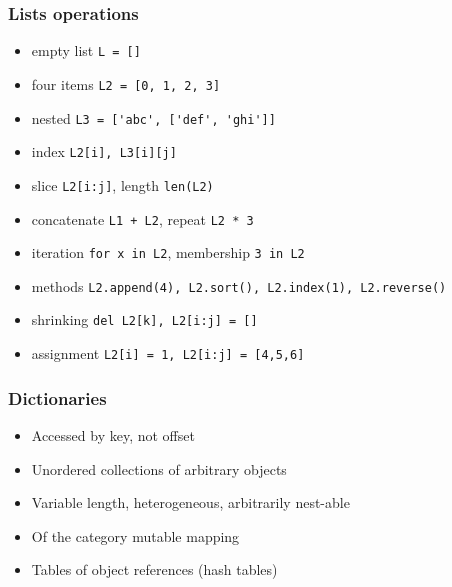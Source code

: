 \begin{frame}[fragile]\frametitle{Lists operations}
  \begin{itemize}
  \item empty list \lstinline{L = []}
  \item four items \lstinline{L2 = [0, 1, 2, 3]}
  \item nested \lstinline{L3 = ['abc', ['def', 'ghi']]}
  \item index \lstinline{L2[i], L3[i][j]}
  \item slice  \lstinline{L2[i:j]}, length \lstinline{len(L2)}
  \item concatenate \lstinline{L1 + L2}, repeat \lstinline{L2 * 3}
  \item iteration \lstinline{for x in L2}, membership \lstinline{3 in L2}
  \item methods \lstinline{L2.append(4), L2.sort(), L2.index(1), L2.reverse()}
  \item shrinking \lstinline{del L2[k], L2[i:j] = []}
  \item assignment \lstinline{L2[i] = 1, L2[i:j] = [4,5,6]}

  \end{itemize}
\end{frame}

\begin{frame}[fragile]\frametitle{Dictionaries}
  \begin{itemize}
  \item Accessed by key, not offset
  \item Unordered collections of arbitrary objects
  \item Variable length, heterogeneous, arbitrarily nest-able
  \item Of the category mutable mapping
  \item Tables of object references (hash tables)
  \end{itemize}
\end{frame}


